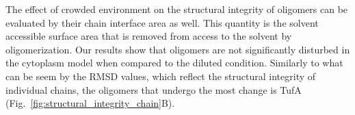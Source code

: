 \documentclass[journal=jpcisd8,manuscript=article]{achemso}
\begin{document}

The effect of crowded environment on the structural integrity of
oligomers can be evaluated by their chain interface area as well. This
quantity is the solvent accessible surface area that is removed from
access to the solvent by oligomerization. Our results show that
oligomers are not significantly disturbed in the cytoplasm model when
compared to the diluted condition. Similarly to what can be seem by
the RMSD values, which reflect the structural integrity of individual
chains, the oligomers that undergo the most change is TufA
(Fig.~\ref{fig:structural_integrity_chain}B).
\end{document}
